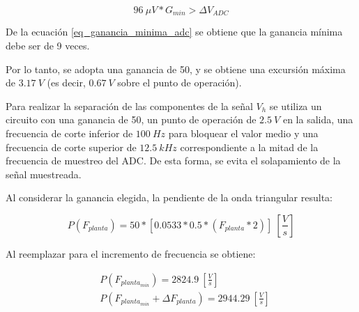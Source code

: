 \begin{equation}\label{eq_ganancia_minima_adc}
	 96\:\mu V * G_{min} > \Delta V_{ADC} 
\end{equation}

De la ecuación \ref{eq_ganancia_minima_adc} se obtiene que la ganancia mínima debe ser de 9 veces.

Por lo tanto, se adopta una ganancia de 50, y se obtiene una excursión máxima de $3.17\:V$ (es decir, $0.67\:V$ sobre el punto de operación).

Para realizar la separación de las componentes de la señal $V_h$ se utiliza un circuito con una ganancia de 50, un punto de operación de $2.5\:V$ en la salida, una frecuencia de corte inferior de $100\:Hz$ para bloquear el valor medio y una frecuencia de corte superior de $12.5\:kHz$ correspondiente a la mitad de la frecuencia de muestreo del ADC. De esta forma, se evita el solapamiento de la señal muestreada.




Al considerar la ganancia elegida,  la pendiente de la onda triangular resulta:

\begin{equation} 
	P(F_{planta}) = 50 * [0.0533 * 0.5 * (F_{planta}*2)]\:[\frac{V}{s}]
\end{equation}

 Al reemplazar para el incremento de frecuencia se obtiene: 

\begin{equation*} 
	\begin{aligned}
		&P(F_{planta_{min}}) = 2824.9 \: [\frac{V}{s}]\\
		&P(F_{planta_{min}} + \Delta F_{planta}) = 2944.29 \: [\frac{V}{s}]\\		 
	\end{aligned}
\end{equation*}

